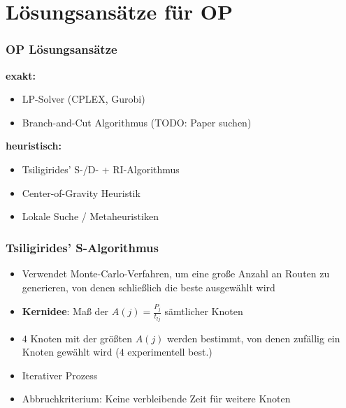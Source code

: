 \documentclass{beamer}
\begin{document}
\section{Lösungsansätze für \textsc{OP}}

\begin{frame}
  \frametitle{OP Lösungsansätze}
  \textbf{exakt:}
  \begin{itemize}
    \item LP-Solver (CPLEX, Gurobi)
    \item Branch-and-Cut Algorithmus (TODO: Paper suchen)
  \end{itemize}
  \textbf{heuristisch:}
  \begin{itemize}
    \item Tsiligirides' S-/D- + RI-Algorithmus
    \item Center-of-Gravity Heuristik
    \item Lokale Suche / Metaheuristiken
  \end{itemize}
\end{frame}

\begin{frame}
  \frametitle{Tsiligirides' S-Algorithmus}
  \begin{itemize}
    \item Verwendet Monte-Carlo-Verfahren, um eine große Anzahl an Routen zu generieren,
    von denen schließlich die beste ausgewählt wird
    \item \textbf{Kernidee}: Maß der  $A(j) = \frac{P_j}{t_{lj}}$ sämtlicher Knoten
    \item $4$ Knoten mit der größten $A(j)$ werden bestimmt, von denen zufällig ein Knoten gewählt wird ($4$ experimentell best.)
    \item Iterativer Prozess
    \item Abbruchkriterium: Keine verbleibende Zeit für weitere Knoten
  \end{itemize}
\end{frame}
\end{document}
